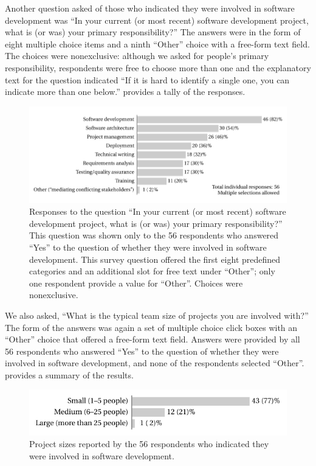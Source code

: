 \documentclass{casicswhitepaper}
\newcommand{\totaldevelopers}{56\xspace}
\begin{document}
Another question asked of those who indicated they were involved in software development was ``In your current (or most recent) software development project, what is (or was) your primary responsibility?'' The answers were in the form of eight multiple choice items and a ninth ``Other'' choice with a free-form text field.  The choices were nonexclusive: although we asked for people's primary responsibility, respondents were free to choose more than one and the explanatory text for the question indicated ``If it is hard to identify a single one, you can indicate more than one below.''   provides a tally of the responses.

\begin{figure}[thb]
  \vspace*{-1ex}
  \centering
  \includegraphics[width=5.9in]{files/plots/responsibilities.pdf}
  \vspace*{-3ex}
  \caption{Responses to the question  ``In your current (or most recent) software development project, what is (or was) your primary responsibility?''  This question was shown only to the 56 respondents who answered ``Yes'' to the question of whether they were involved in software development.  This survey question offered the first eight predefined categories and an additional slot for free text under ``Other''; only one respondent provide a value for ``Other''.  Choices were nonexclusive.}
  \label{responsibilities}
\end{figure}

We also asked, ``What is the typical team size of projects you are involved with?''  The form of the answers was again a set of multiple choice click boxes with an ``Other'' choice that offered a free-form text field.  Answers were provided by all \totaldevelopers respondents who answered ``Yes'' to the question of whether they were involved in software development, and none of the respondents selected ``Other''.   provides a summary of the results.

\begin{figure}[htb]
  \centering
  \includegraphics{files/plots/project-sizes.pdf}
  \vspace*{-3ex}
  \caption{Project sizes reported by the \totaldevelopers respondents who indicated they were involved in software development.}
  \label{project-sizes}
\end{figure}
\end{document}
